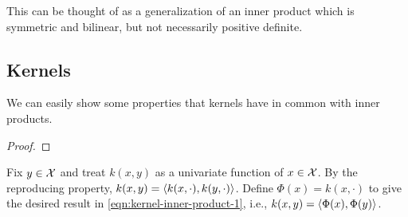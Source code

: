 \begin{definition}
    \label{def:symmetric-bilinear-form}
    
\end{definition}

This can be thought of as a generalization of an inner product which is symmetric and bilinear, but not necessarily positive definite.

\begin{example}
    \label{eg:symmetric-bilinear-form}
    
\end{example}

\subsection{Kernels}
\label{sub:kernels}


\begin{definition}[Kernel]
    \label{def:kernel}
    \cite{rudin2020notes}
    
\end{definition}

We can easily show some properties that kernels have in common with inner products.

\begin{lemma}
    \label{lem:properties-of-kernels}
    \cite{rudin2020notes}
    
\end{lemma}
\begin{proof}
    
\end{proof}

\begin{definition}
    \label{def:feature-map}
    \cite{hofmann2008kernel}
    
\end{definition}



\begin{definition}
    \label{def:reproducing-kernel-hilbert-space}
    \cite{hofmann2008kernel}
    
\end{definition}

Fix \(y \in \mathcal{X}\) and treat \(k(x,y)\) as a univariate function of \(x \in \mathcal{X}\).
By the reproducing property, \(k(x,y) = \left\langle k(x,\cdot),k(y,\cdot) \right\rangle\).
Define \(\Phi(x) = k(x,\cdot)\) to give the desired result in \cref{eqn:kernel-inner-product-1}, i.e., \(k(x,y) = \left\langle \Phi(x),\Phi(y) \right\rangle\).

